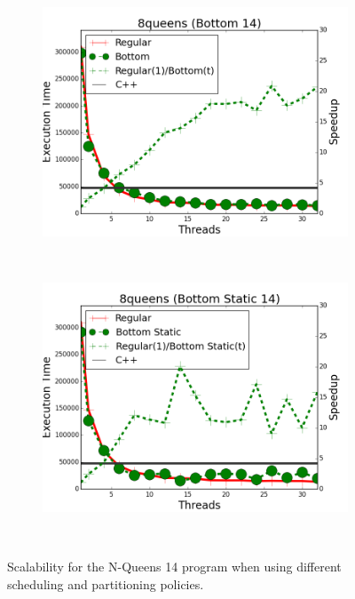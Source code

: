 \begin{figure}[]
        \begin{subfigure}[b]{\plotsize\textwidth}
           \includegraphics[width=\textwidth]{experiments/coordination/cmp-bottom-8queens-14.png}
           \caption{}
           \label{fig:coordination:coord_14queensbottom}
        \end{subfigure} ~
        \begin{subfigure}[b]{\plotsize\textwidth}
           \includegraphics[width=\textwidth]{experiments/coordination/cmp-bottom-static-8queens-14.png}
           \caption{}
           \label{fig:coordination:coord_14queensbottomstatic}
        \end{subfigure} \\
        \caption{Scalability for the N-Queens 14 program when using different
        scheduling and partitioning policies.}
        \label{fig:coordination:results_queens-14}
\end{figure}

%
\clearpage
